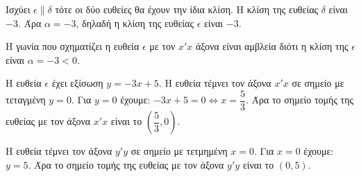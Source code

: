 
\begin{alist}
\item 
\begin{rlist}
\item Ισχύει $\epsilon \parallel \delta$ τότε οι δύο ευθείες θα έχουν την ίδια κλίση.
Η κλίση της ευθείας $\delta$ είναι $-3$. Άρα $\alpha = -3$, δηλαδή η κλίση της ευθείας $\epsilon$ είναι $-3$.
\item Η γωνία που σχηματίζει η ευθεία $\epsilon$ με τον $x'x$ άξονα είναι αμβλεία διότι η κλίση της $\epsilon$ είναι $\alpha = -3 < 0$.
\end{rlist}

\item Η ευθεία $\epsilon$ έχει εξίσωση $y = -3x + 5$.
Η ευθεία τέμνει τον άξονα $x'x$ σε σημείο με τεταγμένη $y = 0$.
Για $y = 0$ έχουμε: $-3x + 5 = 0 \Leftrightarrow x = \dfrac{5}{3}$.
Άρα το σημείο τομής της ευθείας με τον άξονα $x'x$ είναι το $\left(\dfrac{5}{3}, 0\right)$.

Η ευθεία τέμνει τον άξονα $y'y$ σε σημείο με τετμημένη $x = 0$. Για $x = 0$ έχουμε: $y = 5$.
Άρα το σημείο τομής της ευθείας με τον άξονα $y'y$ είναι το $(0, 5)$.
\end{alist}

